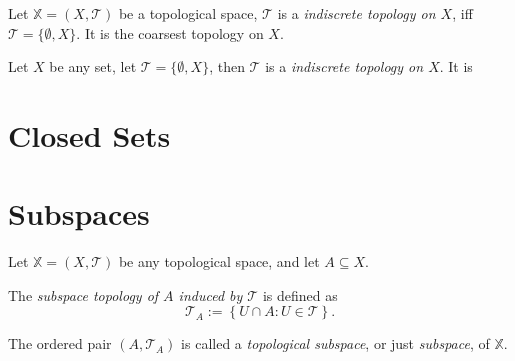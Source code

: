 \begin{example}
	Let $\mathbb X = (X, \mathcal T)$ be a topological space, $\mathcal T$ is a \textit{indiscrete topology on $X$}, iff $\mathcal T = \{\emptyset, X \}$. It is the coarsest topology on $X$.
\end{example}
\begin{example}
	Let $X$ be any set, let $\mathcal T = \{ \emptyset, X \}$, then $\mathcal T$ is a \textit{indiscrete topology on $X$}. It is
\end{example}



\section{Closed Sets}


\section{Subspaces}


\begin{definition}
	\label{def: subspace}
	Let $\mathbb X = (X, \mathcal T)$ be any topological space, and let $A \subseteq X$.
	
	The \textit{subspace topology of $A$ induced by $\mathcal T$} is defined as
	$$
	\mathcal T_A := \left\{ U \cap A : U \in \mathcal T \right\}.
	$$
	
	The ordered pair $(A, \mathcal T_A)$ is called a \textit{topological subspace}, or just \textit{subspace}, of $\mathbb X$.
\end{definition}



